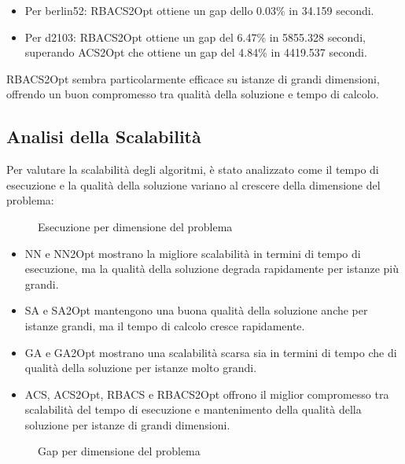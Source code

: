 \begin{itemize}
	\item Per berlin52: RBACS2Opt ottiene un gap dello 0.03\% in 34.159 secondi.
	\item Per d2103: RBACS2Opt ottiene un gap del 6.47\% in 5855.328 secondi, superando ACS2Opt che ottiene un gap del 4.84\% in 4419.537 secondi.
\end{itemize}

RBACS2Opt sembra particolarmente efficace su istanze di grandi dimensioni, offrendo un buon compromesso tra qualità della soluzione e tempo di calcolo.

\subsection{Analisi della Scalabilità}
Per valutare la scalabilità degli algoritmi, è stato analizzato come il tempo di esecuzione e la qualità della soluzione variano al crescere della dimensione del problema:

\begin{figure}[h]
	\caption{Esecuzione per dimensione del problema}
	\label{fig:time_vs_size}
\end{figure}

\begin{itemize}
	\item NN e NN2Opt mostrano la migliore scalabilità in termini di tempo di esecuzione, ma la qualità della soluzione degrada rapidamente per istanze più grandi.
	\item SA e SA2Opt mantengono una buona qualità della soluzione anche per istanze grandi, ma il tempo di calcolo cresce rapidamente.
	\item GA e GA2Opt mostrano una scalabilità scarsa sia in termini di tempo che di qualità della soluzione per istanze molto grandi.
	\item ACS, ACS2Opt, RBACS e RBACS2Opt offrono il miglior compromesso tra scalabilità del tempo di esecuzione e mantenimento della qualità della soluzione per istanze di grandi dimensioni.
\end{itemize}

\begin{figure}[h]
	\caption{Gap per dimensione del problema}
	\label{fig:time_vs_gap}
\end{figure}

